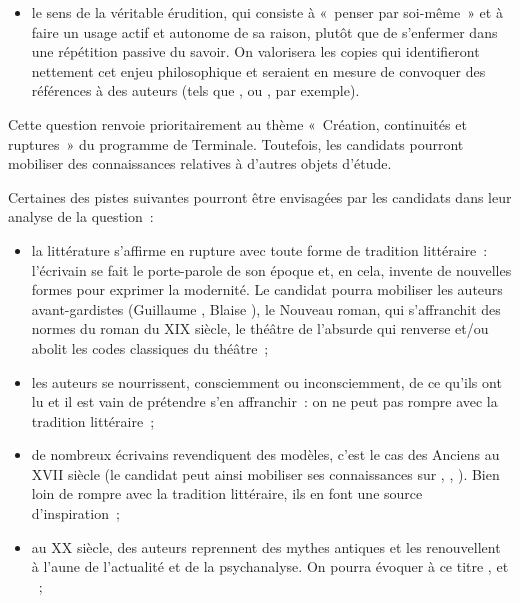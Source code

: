 {\begin{itemize}
\item le sens de la véritable érudition, qui consiste à «~penser par soi-même~» et à faire un
usage actif et autonome de sa raison, plutôt que de s'enfermer dans une répétition
passive du savoir. On valorisera les copies qui identifieront nettement cet enjeu
philosophique et seraient en mesure de convoquer des références à des auteurs (tels
que ,  ou , par exemple).
\end{itemize}}%
		{Cette question renvoie prioritairement au thème «~Création, continuités et ruptures~»
du programme de Terminale. Toutefois, les candidats pourront mobiliser des
connaissances relatives à d'autres objets d'étude.

Certaines des pistes suivantes pourront être envisagées par les candidats dans leur
analyse de la question~:

\begin{itemize}
\item la littérature s'affirme en rupture avec toute forme de tradition littéraire~: l'écrivain
se fait le porte-parole de son époque et, en cela, invente de nouvelles formes pour
exprimer la modernité. Le candidat pourra mobiliser les auteurs avant-gardistes
(Guillaume , Blaise ), le Nouveau roman, qui s'affranchit des normes du
roman du XIX\ieme{} siècle, le théâtre de l'absurde qui renverse et/ou abolit les codes
classiques du théâtre~;

\item les auteurs se nourrissent, consciemment ou inconsciemment, de ce qu'ils ont lu
et il est vain de prétendre s'en affranchir~: on ne peut pas rompre avec la tradition
littéraire~;

\item de nombreux écrivains revendiquent des modèles, c'est le cas des Anciens au
XVII\ieme{} siècle (le candidat peut ainsi mobiliser ses connaissances sur ,
, ). Bien loin de rompre avec la tradition littéraire, ils en font une
source d'inspiration~;

\item au XX\ieme{} siècle, des auteurs reprennent des mythes antiques et les renouvellent à
l'aune de l'actualité et de la psychanalyse. On pourra évoquer à ce titre ,
 et ~;


\end{itemize}}
